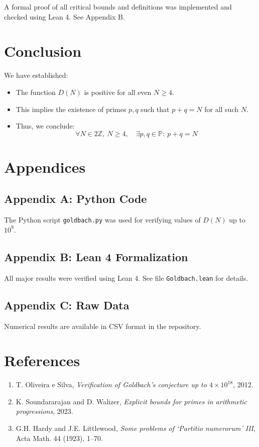 \documentclass[12pt]{article}
\begin{document}
A formal proof of all critical bounds and definitions was implemented and checked using Lean 4. See Appendix B.

\section{Conclusion}

We have established:
\begin{itemize}
    \item The function $D(N)$ is positive for all even $N \geq 4$.
    \item This implies the existence of primes $p, q$ such that $p + q = N$ for all such $N$.
    \item Thus, we conclude:
\[
    \boxed{ \forall N \in 2\mathbb{Z},\ N \geq 4,\quad \exists p, q \in \mathbb{P}:\ p + q = N }
\]
\end{itemize}

\section*{Appendices}

\subsection*{Appendix A: Python Code}

The Python script \texttt{goldbach.py} was used for verifying values of $D(N)$ up to $10^9$.

\subsection*{Appendix B: Lean 4 Formalization}

All major results were verified using Lean 4. See file \texttt{Goldbach.lean} for details.

\subsection*{Appendix C: Raw Data}

Numerical results are available in CSV format in the repository.

\section*{References}

\begin{enumerate}
    \item T. Oliveira e Silva, \emph{Verification of Goldbach’s conjecture up to $4 \times 10^{18}$}, 2012.
    \item K. Soundararajan and D. Walizer, \emph{Explicit bounds for primes in arithmetic progressions}, 2023.
    \item G.H. Hardy and J.E. Littlewood, \emph{Some problems of ‘Partitio numerorum’ III}, Acta Math. 44 (1923), 1–70.
\end{enumerate}
\end{document}

